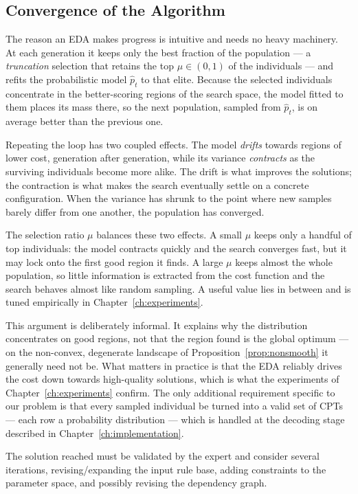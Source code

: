 \subsection{Convergence of the Algorithm}

The reason an EDA makes progress is intuitive and needs no heavy
machinery. At each generation it keeps only the best fraction of the
population — a \emph{truncation} selection that retains the top
$\mu\in(0,1)$ of the individuals — and refits the probabilistic model
$\hat{p}_t$ to that elite. Because the selected individuals
concentrate in the better-scoring regions of the search space, the
model fitted to them places its mass there, so the next population,
sampled from $\hat{p}_t$, is on average better than the previous one.

Repeating the loop has two coupled effects. The model \emph{drifts}
towards regions of lower cost, generation after generation, while its
variance \emph{contracts} as the surviving individuals become more
alike. The drift is what improves the solutions; the contraction is
what makes the search eventually settle on a concrete configuration.
When the variance has shrunk to the point where new samples barely
differ from one another, the population has converged.

The selection ratio $\mu$ balances these two effects. A small $\mu$
keeps only a handful of top individuals: the model contracts quickly
and the search converges fast, but it may lock onto the first good
region it finds. A large $\mu$ keeps almost the whole population, so
little information is extracted from the cost function and the search
behaves almost like random sampling. A useful value lies in between
and is tuned empirically in Chapter~\ref{ch:experiments}.

This argument is deliberately informal. It explains why the
distribution concentrates on good regions, not that the region found
is the global optimum — on the non-convex, degenerate landscape of
Proposition~\ref{prop:nonsmooth} it generally need not be. What
matters in practice is that the EDA reliably drives the cost down
towards high-quality solutions, which is what the experiments of
Chapter~\ref{ch:experiments} confirm. The only additional requirement specific to our
problem is that every sampled individual be turned into a valid set of
CPTs — each row a probability distribution — which is handled at the
decoding stage described in Chapter~\ref{ch:implementation}.

The solution reached must be validated by the expert and consider several iterations, revising/expanding the input rule base, adding constraints to the parameter space, and possibly revising the dependency graph.